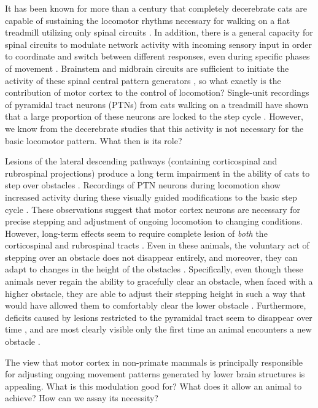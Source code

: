 It has been known for more than a century that completely decerebrate cats are capable of sustaining the locomotor rhythms necessary for walking on a flat treadmill utilizing only spinal circuits \cite{GrahamBrown1911}. In addition, there is a general capacity for spinal circuits to modulate network activity with incoming sensory input in order to coordinate and switch between different responses, even during specific phases of movement \cite{Forssberg1975}. Brainstem and midbrain circuits are sufficient to initiate the activity of these spinal central pattern generators \cite{Grillner1973}, so what exactly is the contribution of motor cortex to the control of locomotion? Single-unit recordings of pyramidal tract neurons (PTNs) from cats walking on a treadmill have shown that a large proportion of these neurons are locked to the step cycle \cite{Armstrong1984a}. However, we know from the decerebrate studies that this activity is not necessary for the basic locomotor pattern. What then is its role?

Lesions of the lateral descending pathways (containing corticospinal and rubrospinal projections) produce a long term impairment in the ability of cats to step over obstacles \cite{Drew2002}. Recordings of PTN neurons during locomotion show increased activity during these visually guided modifications to the basic step cycle \cite{Drew1996}. These observations suggest that motor cortex neurons are necessary for precise stepping and adjustment of ongoing locomotion to changing conditions. However, long-term effects seem to require complete lesion of \emph{both} the corticospinal and rubrospinal tracts \cite{Drew2002}. Even in these animals, the voluntary act of stepping over an obstacle does not disappear entirely, and moreover, they can adapt to changes in the height of the obstacles \cite{Drew2002}. Specifically, even though these animals never regain the ability to gracefully clear an obstacle, when faced with a higher obstacle, they are able to adjust their stepping height in such a way that would have allowed them to comfortably clear the lower obstacle \cite{Drew2002}. Furthermore, deficits caused by lesions restricted to the pyramidal tract seem to disappear over time \cite{Liddell1944}, and are most clearly visible only the first time an animal encounters a new obstacle \cite{Liddell1944}.

The view that motor cortex in non-primate mammals is principally responsible for adjusting ongoing movement patterns generated by lower brain structures is appealing. What is this modulation good for? What does it allow an animal to achieve? How can we assay its necessity?
